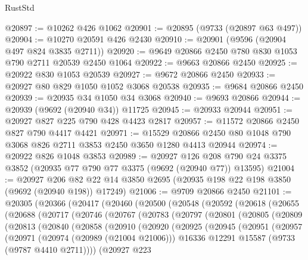 \begin{lexlean}{RustStd}
\begin{coremodule}
{\begin{coremodule}
{{{{{{{{{{{{{{{{{{{{{{{{{{{{{{{{{{{{{{{{{{{{{{{{{{{{{{{@20897 := @10262 @426 @1062
@20901 := @20895 (@9733 (@20897 @63 @497))
@20904 := @10270 @20591 @426 @2430
@20910 := @20901 (@9596 (@20904 @497 @824 @3835 @2711))
@20920 := @9649 @20866 @2450 @780 @830 @1053 @790 @2711 @20539 @2450 @1064
@20922 := @9663 @20866 @2450
@20925 := @20922 @830 @1053 @20539
@20927 := @9672 @20866 @2450
@20933 := @20927 @80 @829 @1050 @1052 @3068 @20538
@20935 := @9684 @20866 @2450
@20939 := @20935 @34 @1050 @34 @3068
@20940 := @9693 @20866
@20944 := @20939 (@9692 (@20940 @34)) @11725
@20945 := @20933 @20944
@20951 := @20927 @827 @225 @790 @428 @4423 @2817
@20957 := @11572 @20866 @2450 @827 @790 @4417 @4421
@20971 := @15529 @20866 @2450 @80 @1048 @790 @3068 @826 @2711 @3853 @2450 @3650 @1280 @4413 @20944
@20974 := @20922 @826 @1048 @3853
@20989 := @20927
    @126
    @208
    @790
    @24
    @3375
    @3852
    (@20935 @77 @790 @77 @3375 (@9692 (@20940 @77)) @13595)
@21004 := @20927
    @206
    @82
    @22
    @14
    @3850
    @2695
    (@20935 @198 @22 @198 @3850 (@9692 (@20940 @198)) @17249)
@21006 := @9709 @20866 @2450
@21101 := @20305
    (@20366
      (@20417
        (@20460
          (@20500
            (@20548
              (@20592
                (@20618
                  (@20655
                    (@20688
                      (@20717
                        (@20746
                          (@20767
                            (@20783
                              (@20797
                                (@20801
                                  (@20805
                                    (@20809
                                      (@20813
                                        (@20840
                                          (@20858
                                            (@20910
                                              (@20920
                                                (@20925
                                                  (@20945
                                                    (@20951
                                                      (@20957
                                                        (@20971
                                                          (@20974 (@20989 (@21004 @21006)))
                                                          @16336
                                                          @12291
                                                          @15587
                                                          (@9733 (@9787 @4410 @2711))))
                                                      (@20927
                                                        @223
}}}}}}}}}}}}}}}}}}}}}}}}}}}}}}}}}}}}}}}}}}}}}}}}}}}}}}}
\end{coremodule}}
\end{coremodule}
\end{lexlean}

